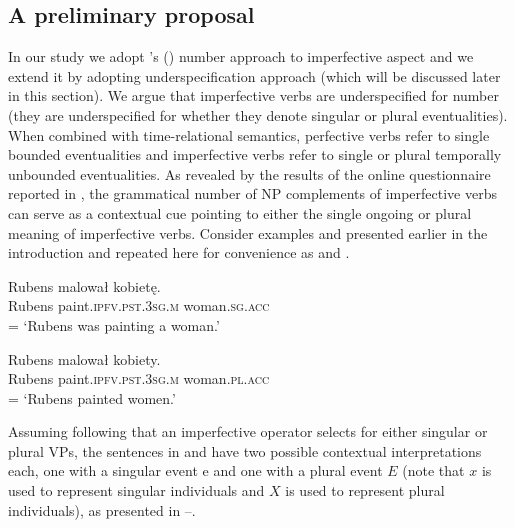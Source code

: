 \documentclass[output=paper]{langscibook}
\begin{document}
\subsection{A preliminary proposal}\label{jan-bla:fansb:kb:sec4.3}

In our study we adopt \citeauthor{Ferreira2004}'s (\citeyear{Ferreira2004, Ferreira2005}) number approach to imperfective aspect and we extend it by adopting  underspecification approach (which will be discussed later in this section). We argue that imperfective verbs are underspecified for number (they are underspecified for whether they denote singular or plural eventualities). When combined with time-relational semantics, perfective verbs refer to single bounded eventualities and imperfective verbs refer to single or plural temporally unbounded eventualities. As revealed by the results of the online questionnaire reported in , the grammatical number of NP complements of imperfective verbs can serve as a contextual cue pointing to either the single ongoing or plural meaning of imperfective verbs. Consider examples  and  presented earlier in the introduction and repeated here for convenience as  and . 

\ea
\gll Rubens malował kobietę.\\  
     Rubens paint.\textsc{ipfv}.\textsc{pst}.\textsc{3sg}.\textsc{m} woman.\textsc{sg}.\textsc{acc}\\\hfill = 
\glt ‘Rubens was painting a woman.’\label{jan-bla:fansb:kb:ex17}
\z

\ea
\gll Rubens malował kobiety.\\  
     Rubens paint.\textsc{ipfv}.\textsc{pst}.\textsc{3sg}.\textsc{m} woman.\textsc{pl}.\textsc{acc}\\\hfill = 
\glt ‘Rubens painted women.’\label{jan-bla:fansb:kb:ex18}
\z

\noindent Assuming following \citet{Ferreira2004, Ferreira2005} that an imperfective operator selects for either singular or plural VPs, the sentences in  and  have two possible contextual interpretations each, one with a singular event e and one with a plural event $E$ (note that $x$ is used to represent singular individuals and $X$ is used to represent plural individuals), as presented in --.
\end{document}
